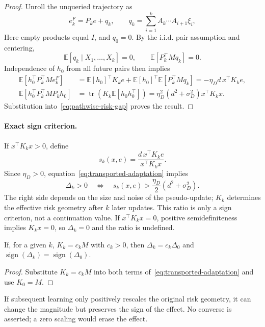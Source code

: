 \begin{proof}
Unroll the unqueried trajectory as
\begin{equation}
    e_k^F=P_ke+q_k,\qquad
    q_k=\sum_{i=1}^k A_k\cdots A_{i+1}\xi_i,
\end{equation}
Here empty products equal $I$, and $q_0=0$. By the i.i.d. pair assumption
and centering,
\begin{equation}
    \mathbb E[q_k\mid X_1,\ldots,X_k]=0,
    \qquad \mathbb E[P_k^\top Mq_k]=0.
\end{equation}
Independence of $h_0$ from all future pairs then implies
\begin{align}
    \mathbb E[h_0^\top P_k^\top Me_k^F]
    &=\mathbb E[h_0]^\top K_ke
      +\mathbb E[h_0]^\top\mathbb E[P_k^\top Mq_k]
      =-\eta_D d\,x^\top K_ke,\\
    \mathbb E[h_0^\top P_k^\top MP_kh_0]
    &=\operatorname{tr}\!\left(K_k\mathbb E[h_0h_0^\top]\right)
      =\eta_D^2(d^2+\sigma_D^2)x^\top K_kx.
\end{align}
Substitution into~\eqref{eq:pathwise-risk-gap} proves the result.
\end{proof}

\paragraph{Exact sign criterion.}
If $x^\top K_kx>0$, define
\begin{equation}
    s_k(x,e)=\frac{d\,x^\top K_ke}{x^\top K_kx}.
\end{equation}
Since $\eta_D>0$, equation~\eqref{eq:transported-adaptation} implies
\begin{equation}
    \Delta_k>0\quad\Longleftrightarrow\quad
    s_k(x,e)>\frac{\eta_D}{2}(d^2+\sigma_D^2).
\end{equation}
The right side depends on the size and noise of the pseudo-update;
$K_k$ determines the effective risk geometry after $k$ later updates.
This ratio is only a sign criterion, not a continuation value. If
$x^\top K_kx=0$, positive semidefiniteness implies $K_kx=0$, so
$\Delta_k=0$ and the ratio is undefined.

\begin{transportproposition}
If, for a given $k$, $K_k=c_kM$ with $c_k>0$, then
$\Delta_k=c_k\Delta_0$ and
$\operatorname{sign}(\Delta_k)=\operatorname{sign}(\Delta_0)$.
\end{transportproposition}
\begin{proof}
Substitute $K_k=c_kM$ into both terms
of~\eqref{eq:transported-adaptation} and use $K_0=M$.
\end{proof}
If subsequent learning only positively rescales the original risk
geometry, it can change the magnitude but preserves the sign of the
effect. No converse is asserted; a zero scaling would erase the effect.

